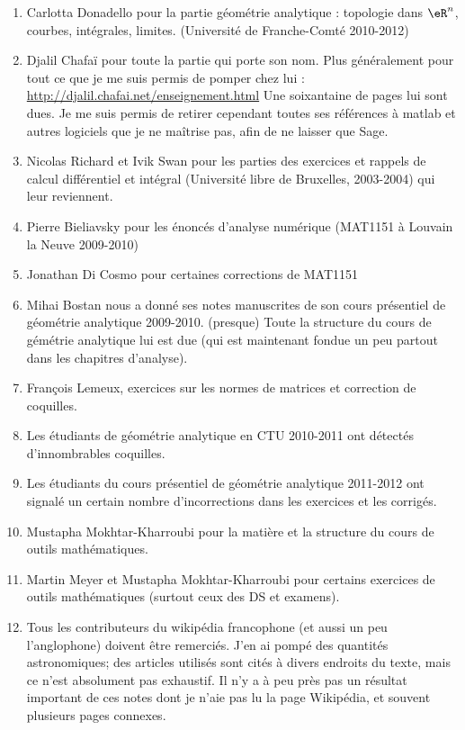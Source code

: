 \begin{enumerate}
    \item Carlotta Donadello pour la partie géométrie analytique : topologie dans \( \eR^n\), courbes, intégrales, limites. (Université de Franche-Comté 2010-2012)
    \item Djalil Chafaï pour toute la partie qui porte son nom. Plus généralement pour tout ce que je me suis permis de pomper chez lui :\\ \href{http://djalil.chafai.net/enseignement.html}{http://djalil.chafai.net/enseignement.html} Une soixantaine de pages lui sont dues. Je me suis permis de retirer cependant toutes ses références à matlab et autres logiciels que je ne maîtrise pas, afin de ne laisser que Sage.
    \item Nicolas Richard et Ivik Swan pour les parties des exercices et rappels de calcul différentiel et intégral (Université libre de Bruxelles, 2003-2004) qui leur reviennent.
    \item Pierre Bieliavsky pour les énoncés d'analyse numérique (MAT1151 à Louvain la Neuve 2009-2010)
    \item Jonathan Di Cosmo pour certaines corrections de MAT1151
    \item
        Mihai Bostan nous a donné ses notes manuscrites de son cours présentiel de géométrie analytique 2009-2010. (presque) Toute la structure du cours de gémétrie analytique lui est due (qui est maintenant fondue un peu partout dans les chapitres d'analyse).
    \item
        François Lemeux, exercices sur les normes de matrices et correction de coquilles.
    \item
        Les étudiants de géométrie analytique en CTU 2010-2011 ont détectés d'innombrables coquilles.
    \item
        Les étudiants du cours présentiel de géométrie analytique 2011-2012 ont signalé un certain nombre d'incorrections dans les exercices et les corrigés.
    \item
        Mustapha Mokhtar-Kharroubi pour la matière et la structure du cours de outils mathématiques.
    \item
        Martin Meyer et Mustapha Mokhtar-Kharroubi pour certains exercices de outils mathématiques (surtout ceux des DS et examens).
    \item
        Tous les contributeurs du wikipédia francophone (et aussi un peu l'anglophone) doivent être remerciés. J'en ai pompé des quantités astronomiques; des articles utilisés sont cités à divers endroits du texte, mais ce n'est absolument pas exhaustif. Il n'y a à peu près pas un résultat important de ces notes dont je n'aie pas lu la page Wikipédia, et souvent plusieurs pages connexes.

\end{enumerate}

